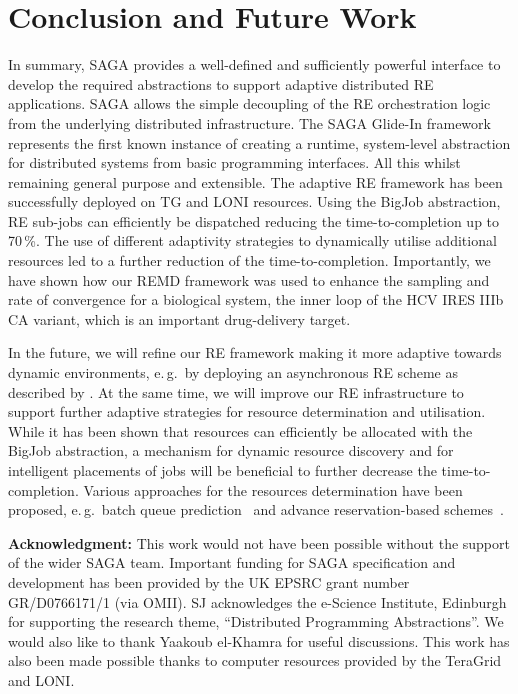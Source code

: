 \documentclass{rspublic}
\newcommand{\glidein}[1]{Glide-In }
\begin{document}
\section{Conclusion and Future Work}

In summary, SAGA provides a well-defined and sufficiently powerful
interface to develop the required abstractions to support adaptive
distributed RE applications.  SAGA allows the simple decoupling
of the RE orchestration logic from the underlying distributed
infrastructure. The SAGA \glidein\ framework represents the first
known instance of creating a runtime, system-level abstraction for
distributed systems from basic programming interfaces. All this whilst
remaining general purpose and extensible.  The adaptive RE framework
has been successfully deployed on TG and LONI resources.  Using
the BigJob abstraction, RE sub-jobs can efficiently be dispatched
reducing the time-to-completion up to 70\,\%. The use of different
adaptivity strategies to dynamically utilise additional resources led
to a further reduction of the time-to-completion.  Importantly, we
have shown how our REMD framework was used to enhance the
sampling and rate of convergence for a biological system, the inner
loop of the HCV IRES IIIb CA variant, which is an important
drug-delivery target.

In the future, we will refine our RE framework making it
more adaptive towards dynamic environments, e.\,g.\ by deploying  
an asynchronous RE scheme as described by \citet{Gallicchio:2007yq}.
At the same time, we will improve our RE infrastructure to support
further adaptive strategies for resource determination and
utilisation.  While it has been shown that resources can efficiently
be allocated with the BigJob abstraction, a mechanism for dynamic
resource discovery and for intelligent placements of jobs will be
beneficial to further decrease the time-to-completion.  Various
approaches for the resources determination have been proposed, e.\,g.\
batch queue prediction~\citep{1254939,Chakraborty:2008nx} and advance
reservation-based schemes~\citep{Jeske:2007wj}. 

\vspace{0.1in}
\noindent
{\bf Acknowledgment:} This work would not have been possible without the support of 
	  the wider SAGA team. Important funding for SAGA
	  specification and development has been provided by the UK EPSRC
	  grant number GR/D0766171/1 (via OMII).  SJ acknowledges the
	  e-Science Institute, Edinburgh for supporting the research theme,
	  ``Distributed Programming Abstractions''.  We would also like to
	  thank Yaakoub el-Khamra for useful discussions. This work has also
	  been made possible thanks to computer resources provided by the
	  TeraGrid and LONI.        
\end{document}

